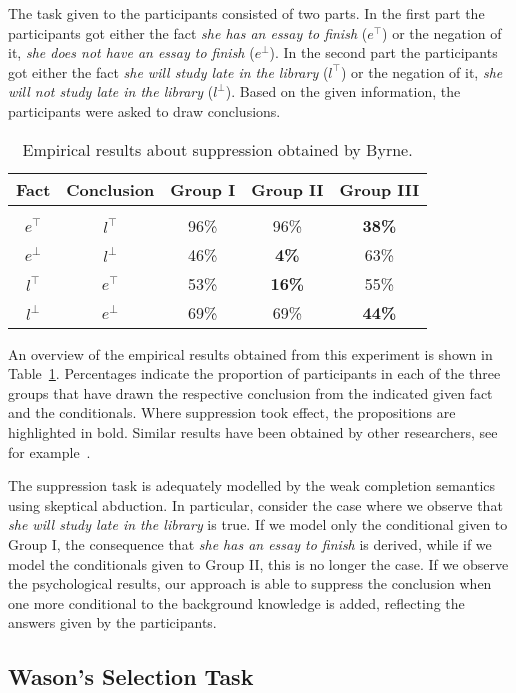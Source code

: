 The task given to the participants consisted of two parts. In the first part the participants got either the fact \textit{she has an essay to finish} ($e^\top$) or the negation of it, \textit{she does not have an essay to finish} ($e^\bot$). In the second part the participants got either the fact \textit{she will study late in the library} ($l^\top$) or the negation of it, \textit{she will not study late in the library} ($l^\bot$). Based on the given information, the participants were asked to draw conclusions.

\begin{table}
\centering
\begin{tabular}{ccccc}
Fact & Conclusion & Group I & Group II & Group III\\
\hline
\hfill	\\		
$e^\top$ & $l^\top$ & 96\% & 96\% & \textbf{38\%}\\
$e^\bot$ & $l^\bot$ & 46\% & \textbf{4\%}   & 63\%\\
$l^\top$ & $e^\top$ & 53\% & \textbf{16\%} & 55\%\\
$l^\bot$ & $e^\bot$ & 69\%  & 69\% & \textbf{44\%}
\end{tabular}
\bigskip
\caption{Empirical results about suppression obtained by Byrne.}
\label{table:suppresion}
\end{table}

An overview of the empirical results obtained from this experiment is shown in Table~\ref{table:suppresion}. Percentages indicate the proportion of participants in each of the three groups that have drawn the respective conclusion from the indicated given fact and the conditionals. Where suppression took effect, the propositions are highlighted in bold. Similar results have been obtained by other researchers, see for example~\cite{dieussaert2000strategies}.

The suppression task is adequately modelled by the weak completion semantics using skeptical abduction. In particular, consider the case where we observe that \textit{she will study late in the library} is true. If we model only the conditional given to Group I, the consequence that \textit{she has an essay to finish} is derived, while if we model the conditionals given to Group II, this is no longer the case. If we observe the psychological results, our approach is able to suppress the conclusion when one more conditional to the background knowledge is added, reflecting the answers given by the participants.

\subsection{Wason's Selection Task}

